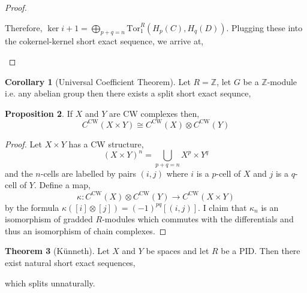 \documentclass[12pt]{extarticle}
\newcommand{\Z}{\mathbb{Z}}
\theoremstyle{definition}
\newtheorem{theorem}{Theorem}[section]
\newtheorem{proposition}[theorem]{Proposition}
\newtheorem{corollary}[theorem]{Corollary}
\newcommand{\Tor}[4]{\mathrm{Tor}^{#1}_{#2} \left( #3, #4 \right)}
\begin{document}
\begin{proof}
\begin{center}
\begin{tikzcd}[column sep = small]
\end{tikzcd}
\end{center} 
Therefore, $\ker{i+1} = \bigoplus\limits_{p+q = n} \Tor{R}{1}{H_p(C)}{H_q(D)}$. 
Plugging these into the cokernel-kernel short exact sequence, we arrive at,
\begin{center}
\end{center}

\end{proof}

\begin{corollary}[Universal Coefficient Theorem]
Let $R = \Z$, let $G$ be a $\Z$-module i.e. any abelian group then there exists a split short exact sequnce,
\begin{center}
\end{center}
\end{corollary}

\begin{proposition}
If $X$ and $Y$ are CW complexes then, 
\[C^{\text{CW}}(X \times Y) \cong C^{\text{CW}}(X) \otimes C^{\text{CW}}(Y)\]  
\end{proposition}

\begin{proof}
Let $X \times Y$ has a CW structure,
\[(X \times Y)^n = \bigcup_{p + q = n} X^p \times Y^q \]
and the $n$-cells are labelled by pairs $(i, j)$ where $i$ is a $p$-cell of $X$ and $j$ is a $q$-cell of $Y$. Define a map, 
\[\kappa : C^{\text{CW}}(X) \otimes C^{\text{CW}}(Y) \to C^{\text{CW}}(X \times Y) \]
by the formula $\kappa([i] \otimes [j]) = (-1)^{pq} [(i,j)]$. I claim that $\kappa_n$ is an isomorphism of gradded $R$-modules which commutes with the differentials and thus an isomorphism of chain complexes.  
\end{proof}

\begin{theorem}[K\"{u}nneth]
Let $X$ and $Y$ be spaces and let $R$ be a PID. Then there exist natural short exact sequences,
\begin{center}
\end{center}
which splits unnaturally. 
\end{theorem}
\end{document}
